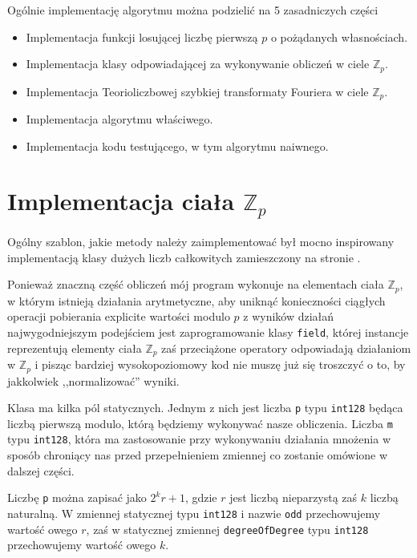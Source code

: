 \documentclass{article}
\begin{document}
Ogólnie implementację algorytmu można podzielić na 5 zasadniczych części
\begin{itemize}
  \item Implementacja funkcji losującej liczbę pierwszą $p$ o pożądanych własnościach.
  \item Implementacja klasy odpowiadającej za wykonywanie obliczeń w ciele $\mathbb{Z}_p$.
  \item Implementacja Teorioliczbowej szybkiej transformaty Fouriera w ciele $\mathbb{Z}_p$.
  \item Implementacja algorytmu właściwego.
  \item Implementacja kodu testującego, w tym algorytmu naiwnego.
\end{itemize}




\section{Implementacja ciała $ \mathbb{Z}_p$}

Ogólny szablon, jakie metody należy zaimplementować był 
mocno inspirowany implementacją klasy dużych liczb całkowitych
zamieszczony na stronie .


Ponieważ znaczną część obliczeń mój program wykonuje na elementach ciała
$\mathbb{Z}_p$, w którym istnieją działania arytmetyczne, aby uniknąć konieczności ciągłych operacji pobierania explicite
wartości modulo $p$ z wyników działań najwygodniejszym podejściem jest zaprogramowanie klasy \texttt{field}, której instancje
reprezentują elementy ciała $\mathbb{Z}_p$ zaś przeciążone operatory odpowiadają działaniom w $\mathbb{Z}_p$ i pisząc bardziej 
wysokopoziomowy kod nie muszę już się troszczyć o to, by jakkolwiek ,,normalizować'' wyniki. 


Klasa ma kilka pól statycznych. Jednym z nich jest liczba \texttt{p} typu \texttt{\textunderscore \textunderscore int128}
będąca liczbą pierwszą modulo, którą będziemy wykonywać nasze obliczenia. Liczba \texttt{m} typu 
\texttt{\textunderscore \textunderscore int128}, która ma zastosowanie przy wykonywaniu działania mnożenia w sposób
chroniący nas przed przepełnieniem zmiennej co zostanie omówione w dalszej części. 

Liczbę \texttt{p} można zapisać jako $2^kr+1$, gdzie $r$ jest liczbą nieparzystą zaś $k$ liczbą naturalną.
W zmiennej statycznej typu \texttt{\textunderscore \textunderscore int128} i nazwie \texttt{odd} przechowujemy
wartość owego $r$, zaś w statycznej zmiennej \texttt{degreeOfDegree} typu
\texttt{\textunderscore \textunderscore int128} przechowujemy wartość owego $k$.
\end{document}
